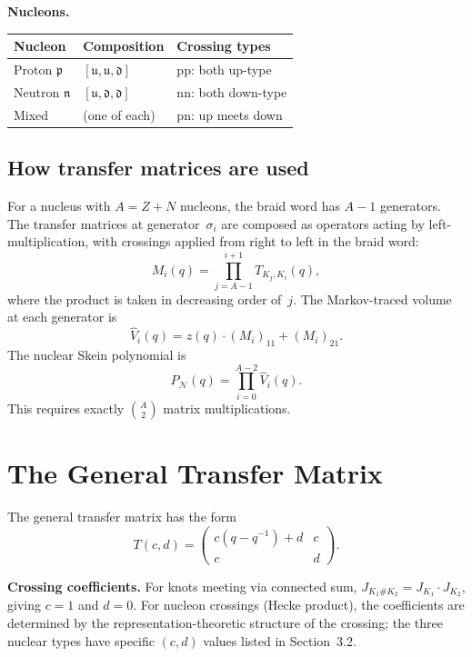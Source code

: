 \documentclass[12pt,a4paper]{article}
\begin{document}
\bigskip

\noindent\textbf{Nucleons.}

\medskip

\begin{tabular}{@{} l l l @{}}
\toprule
\textbf{Nucleon} & \textbf{Composition} & \textbf{Crossing types} \\
\midrule
Proton $\mathfrak{p}$ & $[\mathfrak{u}, \mathfrak{u}, \mathfrak{d}]$ & pp: both up-type \\[2pt]
Neutron $\mathfrak{n}$ & $[\mathfrak{u}, \mathfrak{d}, \mathfrak{d}]$ & nn: both down-type \\[2pt]
Mixed & (one of each) & pn: up meets down \\[2pt]
\bottomrule
\end{tabular}

\bigskip

\subsection*{How transfer matrices are used}

For a nucleus with $A = Z + N$ nucleons, the braid word has $A - 1$
generators. The transfer matrices at generator~$\sigma_i$ are composed as operators acting by left-multiplication, with crossings applied from right to left in the braid word:
\[
  M_i(q) = \prod_{j=A-1}^{i+1} T_{K_j, K_i}(q),
\]
where the product is taken in decreasing order of~$j$.
The Markov-traced volume at each generator is
\[
  \hat{V}_i(q) = z(q) \cdot (M_i)_{11} + (M_i)_{21}.
\]
The nuclear Skein polynomial is
\[
  P_{\mathcal{N}}(q) = \prod_{i=0}^{A-2} \hat{V}_i(q).
\]
This requires exactly $\binom{A}{2}$ matrix multiplications.

\section{The General Transfer Matrix}

The general transfer matrix has the form
\[
  T(c,d) = \begin{pmatrix} c(q - q^{-1}) + d & c \\ c & d \end{pmatrix}.
\]

\medskip

\noindent\textbf{Crossing coefficients.}
For knots meeting via connected sum, $J_{K_1 \# K_2} = J_{K_1} \cdot J_{K_2}$, giving $c = 1$ and $d = 0$.  For nucleon crossings (Hecke product), the coefficients are determined by the representation-theoretic structure of the crossing; the three nuclear types have specific $(c, d)$ values listed in Section~3.2.
\end{document}
